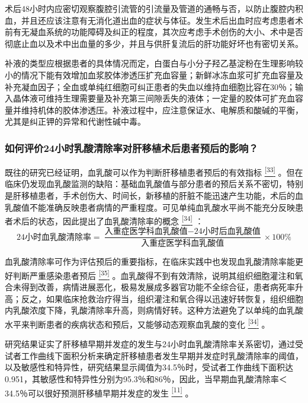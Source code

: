 术后48小时内应密切观察腹腔引流管的引流量及管道的通畅与否，以防止腹腔内积血，并且还应该注意有无消化道出血的症状与体征。发生术后出血时应考虑患者术前有无凝血系统的功能障碍及纠正的程度，其次应考虑手术创伤的大小、术中是否彻底止血以及术中出血量的多少，并且与供肝复流后的肝功能好坏也有密切关系。

补液的类型应根据患者的具体情况而定，白蛋白与小分子羟乙基淀粉在生理影响较小的情况下能有效增加血浆胶体渗透压扩充血容量；新鲜冰冻血浆可扩充血容量及补充凝血因子；全血或单纯红细胞可纠正患者的失血以维持血细胞比容在30％；输入晶体液可维持生理需要量及补充第三间隙丢失的液体；一定量的胶体可扩充血容量并维持机体的胶体渗透压。补液过程中，应注意保证水、电解质和酸碱的平衡，尤其是纠正钾的异常和代谢性碱中毒。

\subsubsection{如何评价24小时乳酸清除率对肝移植术后患者预后的影响？}

既往的研究已经证明，血乳酸可以作为判断肝移植患者预后的有效指标
\protect\hyperlink{text00020.htmlux5cux23ch33-19}{\textsuperscript{{[}33{]}}}
。但在临床仍发现血乳酸监测的缺陷：基础血乳酸值与部分患者的预后关系不密切，特别是肝移植患者，手术创伤大、时间长，新移植的肝脏不能迅速产生功能，术后的血乳酸值不能准确反映患者病情的严重程度。可见单纯血乳酸水平尚不能充分反映患者术后的状态，因此提出了血乳酸清除率的概念
\protect\hyperlink{text00020.htmlux5cux23ch34-19}{\textsuperscript{{[}34{]}}}
：
\[
   \text{24小时血乳酸清除率}=\frac{\text{入重症医学科血乳酸值}-\text{24小时后血乳酸值}}{\text{入重症医学科血乳酸值}}\times 100\% 
\]


血乳酸清除率可作为评估预后的重要指标，在临床实践中也发现血乳酸清除率能更好判断严重感染患者预后
\protect\hyperlink{text00020.htmlux5cux23ch35-19}{\textsuperscript{{[}35{]}}}
。血乳酸得不到有效清除，说明其组织细胞灌注和氧合未得到改善，病情进展恶化，极易发展成多器官功能不全综合征，患者病死率升高；反之，如果临床抢救治疗得当，组织灌注和氧合得以迅速好转恢复，组织细胞内乳酸浓度下降，乳酸清除率升高，则病情好转。这种方法避免了以单纯的血乳酸水平来判断患者的疾病状态和预后，又能够动态观察血乳酸的变化
\protect\hyperlink{text00020.htmlux5cux23ch34-19}{\textsuperscript{{[}34{]}}}
。

研究结果证实了肝移植早期并发症的发生与24小时血乳酸清除率关系密切，通过受试者工作曲线下面积分析来确定肝移植患者发生早期并发症时乳酸清除率的阈值，以及敏感性和特异性，研究结果显示阈值为34.5％时，受试者工作曲线下面积达0.951，其敏感性和特异性分别为95.3％和86％，因此，当早期血乳酸清除率＜34.5％可以很好预测肝移植早期并发症的发生
\protect\hyperlink{text00020.htmlux5cux23ch11-19}{\textsuperscript{{[}11{]}}}
。

